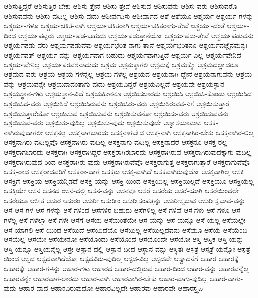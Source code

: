 {ಆಶಿಸುತ್ತಿದ್ದರೆ
ಆಶಿಸುತ್ತಿರ-ಬೇಕು
ಆಶಿಸು-ತ್ತೇನೆ
ಆಶಿಸು-ತ್ತೇವೆ
ಆಶಿಸುವ
ಆಶಿಸುವನು
ಆಶಿಸು-ವರು
ಆಶಿಸುವರೊ
ಆಶಿಸುವವನು
ಆಶಿಸು-ವುದಿಲ್ಲ
ಆಶಿಸು-ವುದು
ಆಶೀರ್ವದಿಸು
ಆಶೀರ್ವಾದ
ಆಶೆ
ಆಶೆಯೂ
ಆಶ್ಚರ್ಯ
ಆಶ್ಚರ್ಯ-ಗಳನ್ನು
ಆಶ್ಚರ್ಯ-ಗಳೂ
ಆಶ್ಚರ್ಯಚಕಿತ-ನಾಗಿ
ಆಶ್ಚರ್ಯಚಕಿತರಾಗಿ
ಆಶ್ಚರ್ಯಚಕಿತರಾಗು-ತ್ತೇವೆ
ಆಶ್ಚರ್ಯ-ದಂತೆ
ಆಶ್ಚರ್ಯ-ದಿಂದ
ಆಶ್ಚರ್ಯಪಟ್ಟರು
ಆಶ್ಚರ್ಯಪಡ-ಬಹುದು
ಆಶ್ಚರ್ಯಪಡುತ್ತಾನೆಯೋ
ಆಶ್ಚರ್ಯಪಡು-ತ್ತೇವೆ
ಆಶ್ಚರ್ಯಪಡುವನು
ಆಶ್ಚರ್ಯಪಡು-ವರು
ಆಶ್ಚರ್ಯಪಡುವೆವು
ಆಶ್ಚರ್ಯಭರಿತ-ನಾಗು-ತ್ತಾನೆ
ಆಶ್ಚರ್ಯಭರಿತನೂ
ಆಶ್ಚರ್ಯವಚ್ಚೈನಮನ್ಯಃ
ಆಶ್ಚರ್ಯವತ್
ಆಶ್ಚರ್ಯ-ವನ್ನು
ಆಶ್ಚರ್ಯವಾಗ-ಬಹುದು
ಆಶ್ಚರ್ಯವಾಗುತ್ತಿದೆ
ಆಶ್ಚರ್ಯ-ವಿಲ್ಲ
ಆಶ್ಚರ್ಯವೇನಿದೆ
ಆಶ್ಚರ್ಯವೇನಿಲ್ಲ
ಆಶ್ಟರ್ಯಪರವಶನಾದುದು
ಆಶ್ರಮ
ಆಶ್ರಮಕ್ಕಾಗಲಿ
ಆಶ್ರಮಕ್ಕೆ
ಆಶ್ರಮಕ್ಕೊ
ಆಶ್ರಮದಲ್ಲಾದರೂ
ಆಶ್ರಮದ-ವರು
ಆಶ್ರಯ
ಆಶ್ರಯ-ಗಳನ್ನೆಲ್ಲ
ಆಶ್ರಯ-ಗಳೆಲ್ಲ
ಆಶ್ರಯದ
ಆಶ್ರಯನಾಗಿ-ದ್ದೇನೆ
ಆಶ್ರಯನಾಗುವನು
ಆಶ್ರಯ-ವನ್ನು
ಆಶ್ರಯವನ್ನೇ
ಆಶ್ರಯವಾದಂತಾಗು-ವುದು
ಆಶ್ರಯವಿದ್ದರೆ
ಆಶ್ರಯವಿಲ್ಲದೆ
ಆಶ್ರಯವೇ
ಆಶ್ರಯಸ್ಥಾನ
ಆಶ್ರಯಸ್ಥಾನ-ಗಳು
ಆಶ್ರಯಸ್ಥಾನ-ವಿದೆ
ಆಶ್ರಯಹೀನನೂ
ಆಶ್ರಯಿಸಬಾರದು
ಆಶ್ರಯಿಸಿ
ಆಶ್ರಯಿಸಿ-ಕೊಂಡು
ಆಶ್ರಯಿಸಿದ
ಆಶ್ರಯಿಸಿದ-ವರು
ಆಶ್ರಯಿಸಿದೆ
ಆಶ್ರಯಿಸಿರುವನು
ಆಶ್ರಯಿಸಿರು-ವರು
ಆಶ್ರಯಿಸಿರುವವ-ನಿಗೆ
ಆಶ್ರಯಿಸುತ್ತಾರೆ
ಆಶ್ರಯಿಸುತ್ತಾರೆಯೋ
ಆಶ್ರಯಿಸುವ
ಆಶ್ರಯಿಸುವನು
ಆಶ್ರಯಿಸುವನೋ
ಆಶ್ರಯಿಸು-ವರು
ಆಶ್ರಯಿಸುವವನು
ಆಶ್ರಯಿಸುವ-ವರು
ಆಶ್ರಯಿಸು-ವುದಿಲ್ಲ
ಆಶ್ರಯಿಸು-ವುದು
ಆಶ್ರಯಿಸುವುದೇ
ಆಶ್ವಾಸಯಾಮಾಸ
ಆಸಕ್ತ-ನಾಗಿರುವುದಾಗಲೀ
ಆಸಕ್ತನಲ್ಲ
ಆಸಕ್ತನಾಗಬಾರದು
ಆಸಕ್ತನಾಗಬೇಡ
ಆಸಕ್ತ-ನಾಗಿ
ಆಸಕ್ತನಾಗಿರ-ಬೇಕು
ಆಸಕ್ತನಾಗಿರ-ಲಿಲ್ಲ
ಆಸಕ್ತನಾಗಿರು-ವುದಿಲ್ಲವೊ
ಆಸಕ್ತನಾಗಿರು-ವುದಿಲ್ಲ
ಆಸಕ್ತನಾಗು-ವುದಿಲ್ಲ
ಆಸಕ್ತನಾದರೆ
ಆಸಕ್ತನೂ
ಆಸಕ್ತ-ರಲ್ಲ
ಆಸಕ್ತರಾಗಬಾರದು
ಆಸಕ್ತರಾಗಿ
ಆಸಕ್ತರಾಗಿದ್ದರೆ
ಆಸಕ್ತರಾಗಿರಬಾರದು
ಆಸಕ್ತರಾಗಿರುವ
ಆಸಕ್ತರಾಗಿರುವುದಕ್ಕಾಗು-ವುದಿಲ್ಲ
ಆಸಕ್ತರಾಗಿರುವುದ-ರಿಂದ
ಆಸಕ್ತರಾಗಿರು-ವುದು
ಆಸಕ್ತರಾಗಿರುವೆವೊ
ಆಸಕ್ತರಾಗುತ್ತ
ಆಸಕ್ತರಾಗುತ್ತಾರೆ
ಆಸಕ್ತರಾಗುವೆವೊ
ಆಸಕ್ತ-ರಾದ
ಆಸಕ್ತರಾದವರಿಗೆ
ಆಸಕ್ತರಾ-ದಾಗ
ಆಸಕ್ತರು
ಆಸಕ್ತ-ವಾಗಿದೆ
ಆಸಕ್ತವಾಗಿರುವುದೋ
ಆಸಕ್ತವಾಗಿಲ್ಲ
ಆಸಕ್ತಿ
ಆಸಕ್ತಿಗೆ
ಆಸಕ್ತಿಯ
ಆಸಕ್ತಿಯನ್ನಿಡದೆ
ಆಸಕ್ತಿ-ಯನ್ನು
ಆಸಕ್ತಿ-ಯಿಂದ
ಆಸಕ್ತಿಯಿಲ್ಲ
ಆಸಕ್ತಿಯಿಲ್ಲದೆ
ಆಸಕ್ತಿಯೂ
ಆಸಕ್ತಿಯೆಲ್ಲ
ಆಸಕ್ತಿಯೇ
ಆಸನ
ಆಸನದ
ಆಸನ-ದಲ್ಲಿ
ಆಸನ-ವನ್ನು
ಆಸನವೂ
ಆಸರೆ
ಆಸರೆಯ
ಆಸರೆ-ಯಾಗಿ
ಆಸರೆಯಿಂದಲೇ
ಆಸರೆಯೂ
ಆಸೀತ
ಆಸುರ
ಆಸುರಂ
ಆಸುರೀ
ಆಸುರೀಂ
ಆಸುರೀಸಂಪತ್ತನ್ನು
ಆಸುರೀಸ್ವಭಾವ
ಆಸುರೀಸ್ವಭಾವ-ವನ್ನು
ಆಸೆ
ಆಸೆ-ಗಳ
ಆಸೆ-ಗಳನ್ನು
ಆಸೆ-ಗಳಿಂದ
ಆಸೆಗಳಿರ-ಬಹುದು
ಆಸೆಗಳಿಲ್ಲ
ಆಸೆ-ಗಳಿವೆ
ಆಸೆ-ಗಳು
ಆಸೆ-ಗಳೂ
ಆಸೆ-ಗಳೆಲ್ಲ
ಆಸೆ-ಗಳೆಲ್ಲಾ
ಆಸೆ-ಗಳೇ
ಆಸೆಗೆ
ಆಸೆಯ
ಆಸೆಯಂತೆಯೇ
ಆಸೆ-ಯನ್ನು
ಆಸೆ-ಯನ್ನೂ
ಆಸೆ-ಯಲ್ಲ
ಆಸೆಯಲ್ಲೇ
ಆಸೆ-ಯಾಗಲಿ
ಆಸೆ-ಯಿಂದ
ಆಸೆಯಿದೆ
ಆಸೆಯಿದೆಯೊ
ಆಸೆಯಿಲ್ಲ
ಆಸೆಯಿಲ್ಲದವನು
ಆಸೆಯೂ
ಆಸೆಯೆ
ಆಸೆಯೆಂಬ
ಆಸೆಯೆಲ್ಲ
ಆಸೆಯೇ
ಆಸೆಯೇನೋ
ಆಸೆಯೊಂದು
ಆಸೆಯೊಂದೆ
ಆಸೆಯೊಂದೇ
ಆಸೆಯೋ
ಆಸ್ತಿ
ಆಸ್ತಿಕ
ಆಸ್ತಿ-ಯನ್ನು
ಆಸ್ತಿ-ಯನ್ನೂ
ಆಸ್ತಿಯನ್ನೆಲ್ಲ
ಆಸ್ತೇ
ಆಸ್ಥಾನ-ದಲ್ಲಿ
ಆಸ್ಥಾನ-ದಿಂದ
ಆಸ್ಥಾನ-ವನ್ನು
ಆಸ್ಥಿತಃ
ಆಸ್ಪತ್ರೆ
ಆಸ್ಪತ್ರೆ-ಯನ್ನೋ
ಆಸ್ಪತ್ರೆ-ಯಿಂದ
ಆಸ್ಪದ
ಆಸ್ಪದವಾಗಿದೆಯೋ
ಆಸ್ಪದವಿರು-ವುದಿಲ್ಲ
ಆಸ್ಪದ-ವಿಲ್ಲ
ಆಸ್ಪದವೇ
ಆಸ್ವಾದನೆಗೆ
ಆಹಾರ
ಆಹಾರಕ್ಕೆ
ಆಹಾರಕ್ಕೇ
ಆಹಾರ-ಗಳನ್ನು
ಆಹಾರ-ಗಳು
ಆಹಾರದ
ಆಹಾರ-ದಲ್ಲಿರುವ
ಆಹಾರ-ದಿಂದ
ಆಹಾರ-ವನ್ನು
ಆಹಾರವನ್ನೆಲ್ಲ
ಆಹಾರವನ್ನೇ
ಆಹಾರವಾಗ-ಲಾರದು
ಆಹಾರ-ವಾಗಿ
ಆಹಾರವಾಗಿರ-ಬೇಕು
ಆಹಾರ-ವಾಗು-ವುದಿಲ್ಲ
ಆಹಾರ-ವಾಗು-ವುದು
ಆಹಾರ-ವಾದ
ಆಹಾರವಿರುವುದೋ
ಆಹಾರವಿಲ್ಲದೇ
ಆಹಾರವು
ಆಹಾರವೇ
ಆಹಾರಸ್ತ್ವಪಿ
}
